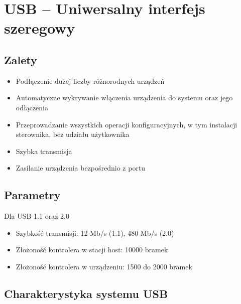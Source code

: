\newpage
\section{USB – Uniwersalny interfejs szeregowy}
	\subsection{Zalety}
	\begin{itemize}
		\item Podłączenie dużej liczby różnorodnych urządzeń
		\item Automatyczne wykrywanie włączenia urządzenia do systemu oraz jego odłączenia
		\item Przeprowadzanie wszystkich operacji konfiguracyjnych, w tym instalacji sterownika, bez udziału użytkownika
		\item Szybka transmisja
		\item Zasilanie urządzenia bezpośrednio z portu
	\end{itemize}
	\subsection{Parametry}
	Dla USB 1.1 oraz 2.0
	\begin{itemize}
		\item Szybkość transmisji: 12 Mb/s (1.1), 480 Mb/s (2.0)
		\item Złożoność kontrolera w stacji host: 10000 bramek
		\item Złożoność kontrolera w urządzeniu: 1500 do 2000 bramek
	\end{itemize}
	\subsection{Charakterystyka systemu USB}
